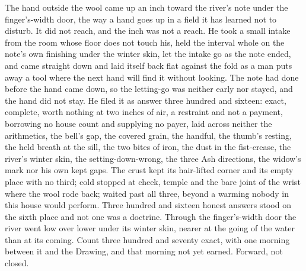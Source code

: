 The hand outside the wool came up an inch toward the river's note under the finger's-width door, the way a hand goes up in a field it has learned not to disturb. It did not reach, and the inch was not a reach. He took a small intake from the room whose floor does not touch his, held the interval whole on the note's own finishing under the winter skin, let the intake go as the note ended, and came straight down and laid itself back flat against the fold as a man puts away a tool where the next hand will find it without looking. The note had done before the hand came down, so the letting-go was neither early nor stayed, and the hand did not stay. He filed it as answer three hundred and sixteen: exact, complete, worth nothing at two inches of air, a restraint and not a payment, borrowing no house count and supplying no payer, laid across neither the arithmetics, the bell's gap, the covered grain, the handful, the thumb's resting, the held breath at the sill, the two bites of iron, the dust in the fist-crease, the river's winter skin, the setting-down-wrong, the three Ash directions, the widow's mark nor his own kept gaps. The crust kept its hair-lifted corner and its empty place with no third; cold stopped at cheek, temple and the bare joint of the wrist where the wool rode back;  waited past all three, beyond a warming nobody in this house would perform. Three hundred and sixteen honest answers stood on the sixth place and not one was a doctrine. Through the finger's-width door the river went low over lower under its winter skin, nearer at the going of the water than at its coming. Count three hundred and seventy exact, with one morning between it and the Drawing, and that morning not yet earned. Forward, not closed.
